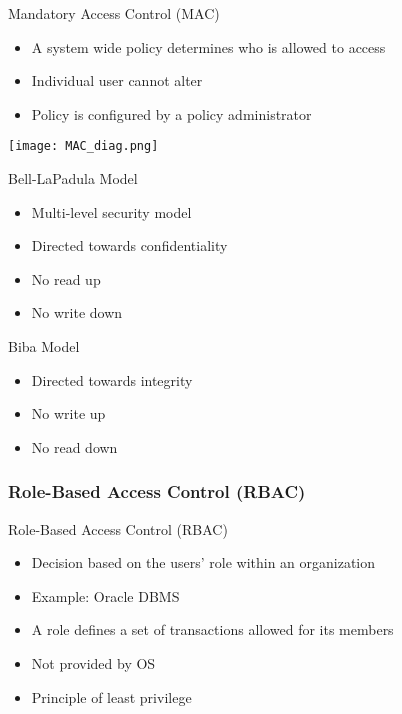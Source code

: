 \begin{definition}{Mandatory Access Control (MAC)}\\
    \begin{itemize}
        \item A system wide policy determines who is allowed to access
        \item Individual user cannot alter
        \item Policy is configured by a policy administrator
    \end{itemize}
    
    \texttt{[image: MAC\_diag.png]}
\end{definition}

\begin{concept}{Bell-LaPadula Model}\\
    \begin{itemize}
        \item Multi-level security model
        \item Directed towards confidentiality
        \item No read up
        \item No write down
    \end{itemize}
\end{concept}

\begin{concept}{Biba Model}\\
    \begin{itemize}
        \item Directed towards integrity
        \item No write up
        \item No read down
    \end{itemize}
\end{concept}

\subsubsection{Role-Based Access Control (RBAC)}

\begin{definition}{Role-Based Access Control (RBAC)}\\
    \begin{itemize}
        \item Decision based on the users' role within an organization
        \item Example: Oracle DBMS
        \item A role defines a set of transactions allowed for its members
        \item Not provided by OS
        \item Principle of least privilege
    \end{itemize}
    
    
\end{definition}

